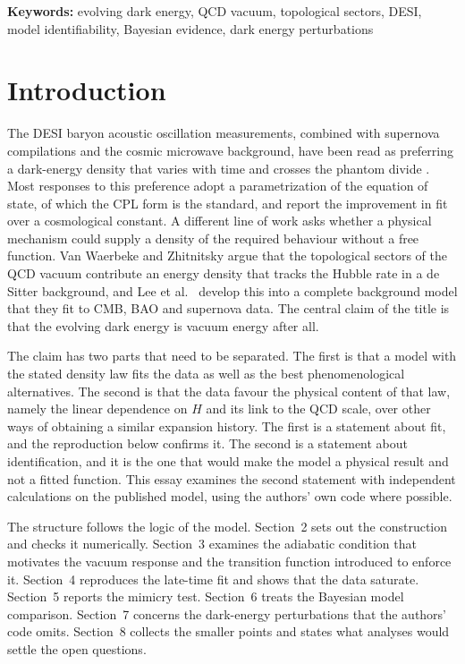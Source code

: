 \documentclass[11pt]{article}
\begin{document}
\vspace{1.5em}
\noindent\textbf{Keywords:} evolving dark energy, QCD vacuum, topological sectors, DESI, model identifiability, Bayesian evidence, dark energy perturbations

\newpage

\section{Introduction}

The DESI baryon acoustic oscillation measurements, combined with supernova compilations and the cosmic microwave background, have been read as preferring a dark-energy density that varies with time and crosses the phantom divide \cite{DESI2025}. Most responses to this preference adopt a parametrization of the equation of state, of which the CPL form \cite{CP2001,Linder2003} is the standard, and report the improvement in fit over a cosmological constant. A different line of work asks whether a physical mechanism could supply a density of the required behaviour without a free function. Van Waerbeke and Zhitnitsky \cite{VWZ2025} argue that the topological sectors of the QCD vacuum \cite{Zh2015,Zh2014} contribute an energy density that tracks the Hubble rate in a de Sitter background, and Lee et al.\ \cite{Lee2026} develop this into a complete background model that they fit to CMB, BAO and supernova data. The central claim of the title is that the evolving dark energy is vacuum energy after all.

The claim has two parts that need to be separated. The first is that a model with the stated density law fits the data as well as the best phenomenological alternatives. The second is that the data favour the physical content of that law, namely the linear dependence on $H$ and its link to the QCD scale, over other ways of obtaining a similar expansion history. The first is a statement about fit, and the reproduction below confirms it. The second is a statement about identification, and it is the one that would make the model a physical result and not a fitted function. This essay examines the second statement with independent calculations on the published model, using the authors' own code where possible.

The structure follows the logic of the model. Section~2 sets out the construction and checks it numerically. Section~3 examines the adiabatic condition that motivates the vacuum response and the transition function introduced to enforce it. Section~4 reproduces the late-time fit and shows that the data saturate. Section~5 reports the mimicry test. Section~6 treats the Bayesian model comparison. Section~7 concerns the dark-energy perturbations that the authors' code omits. Section~8 collects the smaller points and states what analyses would settle the open questions.
\end{document}
